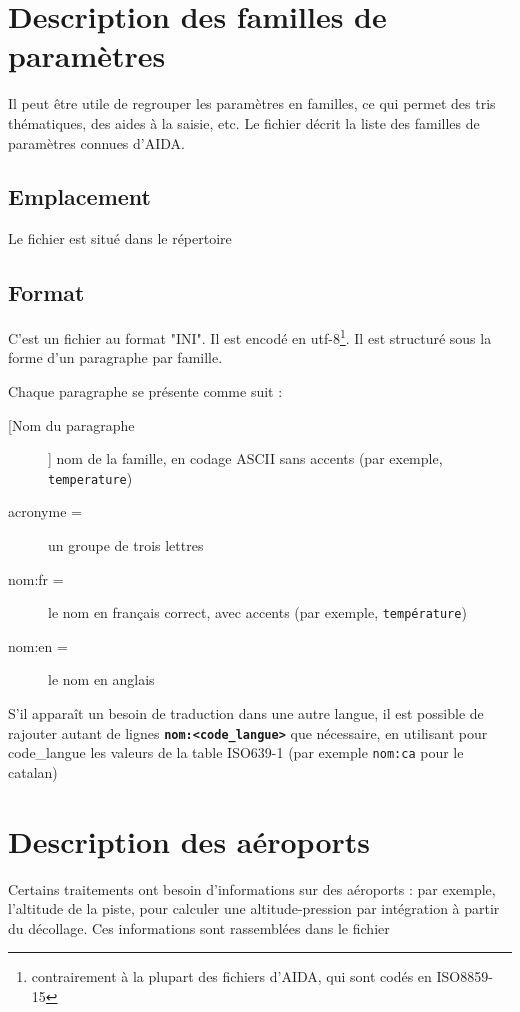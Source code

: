 \section{Description des familles de paramètres }
\label{sec:familles}

Il peut être utile de regrouper les paramètres en familles, ce qui
permet des tris thématiques, des aides à la saisie, etc.
Le fichier 
décrit la liste des familles de paramètres connues d'AIDA.

\subsection{Emplacement}
 Le fichier  est situé dans le répertoire

\subsection{Format}
   C'est un fichier au format "INI". Il est encodé en
utf-8\footnote{contrairement à la plupart des fichiers d'AIDA,
qui sont codés en ISO8859-15}.
   Il est structuré sous la forme d'un paragraphe par famille. 

Chaque paragraphe se présente comme suit :
\begin{description}
  \item[[Nom du paragraphe]] nom de la famille, en codage ASCII sans accents (par exemple, \texttt{temperature})
  \item[acronyme = ]un groupe de trois lettres
  \item[nom:fr = ] le nom en français correct, avec accents (par exemple, \texttt{température})
  \item[nom:en = ] le nom en anglais
\end{description}
  S'il apparaît un besoin de traduction dans une autre langue,
il est possible de rajouter autant de lignes \textbf{\texttt{nom:<code\_langue>}} que nécessaire,
en utilisant pour code\_langue les valeurs de la table ISO639-1 (par
exemple \texttt{nom:ca} pour le catalan)


\section{Description des aéroports}
\label{sec:aeroports}
  Certains traitements ont besoin d'informations sur des aéroports : par
exemple, l'altitude de la piste, pour calculer une altitude-pression par
intégration à partir du décollage. Ces informations sont rassemblées dans
le fichier 

